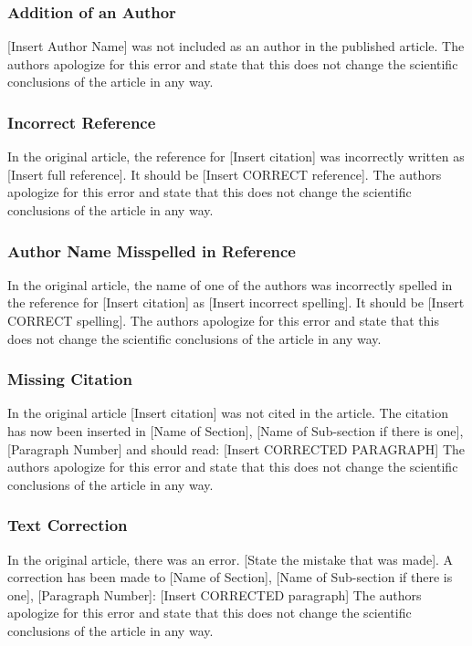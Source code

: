 \documentclass[utf8]{frontiers_correction}
\begin{document}
\subsubsection*{Addition of an Author}
[Insert Author Name] was not included as an author in the published article. The authors apologize for this error and state that this does not change the scientific conclusions of the article in any way.

\subsubsection*{Incorrect Reference}
In the original article, the reference for [Insert citation] was incorrectly written as [Insert full reference]. It should be [Insert CORRECT reference]. The authors apologize for this error and state that this does not change the scientific conclusions of the article in any way.

\subsubsection*{Author Name Misspelled in Reference}
In the original article, the name of one of the authors was incorrectly spelled in the reference for [Insert citation] as [Insert incorrect spelling]. It should be [Insert CORRECT spelling]. The authors apologize for this error and state that this does not change the scientific conclusions of the article in any way.

\subsubsection*{Missing Citation}
In the original article [Insert citation] was not cited in the article. The citation has now been inserted in [Name of Section], [Name of Sub-section if there is one], [Paragraph Number] and should read:
[Insert CORRECTED PARAGRAPH]
The authors apologize for this error and state that this does not change the scientific conclusions of the article in any way.

\subsubsection*{Text Correction}
In the original article, there was an error. [State the mistake that was made].
A correction has been made to [Name of Section], [Name of Sub-section if there is one], [Paragraph Number]:
[Insert CORRECTED paragraph]
The authors apologize for this error and state that this does not change the scientific conclusions of the article in any way.
\end{document}
